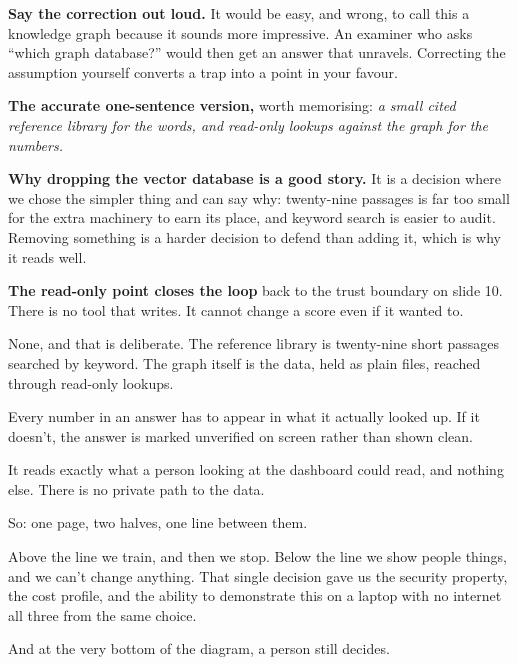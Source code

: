 \documentclass[11pt]{article}
\begin{document}
\begin{means}
\textbf{Say the correction out loud.} It would be easy, and wrong, to call this
a knowledge graph because it sounds more impressive. An examiner who asks
``which graph database?'' would then get an answer that unravels. Correcting the
assumption yourself converts a trap into a point in your favour.

\textbf{The accurate one-sentence version,} worth memorising: \emph{a small
cited reference library for the words, and read-only lookups against the graph
for the numbers.}

\textbf{Why dropping the vector database is a good story.} It is a decision
where we chose the simpler thing and can say why: twenty-nine passages is far
too small for the extra machinery to earn its place, and keyword search is
easier to audit. Removing something is a harder decision to defend than adding
it, which is why it reads well.

\textbf{The read-only point closes the loop} back to the trust boundary on slide
10. There is no tool that writes. It cannot change a score even if it wanted to.
\end{means}

\begin{asked}
 None, and that is deliberate. The reference
library is twenty-nine short passages searched by keyword. The graph itself is
the data, held as plain files, reached through read-only lookups.

 Every number in an answer has to
appear in what it actually looked up. If it doesn't, the answer is marked
unverified on screen rather than shown clean.

 It reads exactly what a person
looking at the dashboard could read, and nothing else. There is no private path
to the data.
\end{asked}



\begin{saythis}
So: one page, two halves, one line between them.

Above the line we train, and then we stop. Below the line we show people
things, and we can't change anything. That single decision gave us the security
property, the cost profile, and the ability to demonstrate this on a laptop
with no internet \bt all three from the same choice.

And at the very bottom of the diagram, a person still decides.
\end{saythis}
\end{document}
